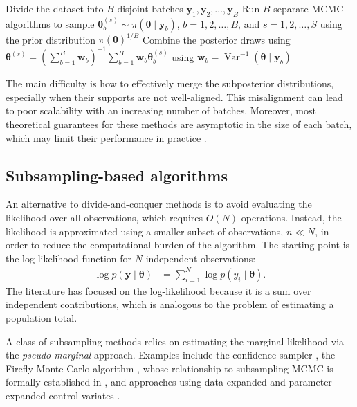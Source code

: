 \begin{algorithm}[h!]
	\caption{Consensus Monte Carlo algorithm}\label{Alg:CMC}
	\begin{algorithmic}[1]
		\State Divide the dataset into \( B \) disjoint batches $\mathbf{y}_1, \mathbf{y}_2, \dots, \mathbf{y}_B$
		\State Run $B$ separate MCMC algorithms to sample $\boldsymbol{\theta}_b^{(s)}\sim \pi(\boldsymbol{\theta}\mid \mathbf{y}_b)$, $b=1,2,\dots,B$, and $s=1,2,\dots,S$ using the prior distribution $\pi(\boldsymbol{\theta})^{1/B}$
		\State Combine the posterior draws using $\boldsymbol{\theta}^{(s)}=\left(\sum_{b=1}^B\mathbf{w}_b\right)^{-1} \sum_{b=1}^B\mathbf{w}_b \boldsymbol{\theta}^{(s)}_b$ using \( \mathbf{w}_b = \operatorname{Var}^{-1}(\boldsymbol{\theta} \mid \mathbf{y}_b) \)    		 			 
	\end{algorithmic} 
\end{algorithm}

The main difficulty is how to effectively merge the subposterior distributions, especially when their supports are not well-aligned. This misalignment can lead to poor scalability with an increasing number of batches. Moreover, most theoretical guarantees for these methods are asymptotic in the size of each batch, which may limit their performance in practice \cite{bardenet2017markov}.

\subsection{Subsampling-based algorithms}

An alternative to divide-and-conquer methods is to avoid evaluating the likelihood over all observations, which requires \( O(N) \) operations. Instead, the likelihood is approximated using a smaller subset of observations, \( n \ll N \), in order to reduce the computational burden of the algorithm. The starting point is the log-likelihood function for \( N \) independent observations:
\begin{align*}
	\log p(\mathbf{y} \mid \boldsymbol{\theta}) &= \sum_{i=1}^N \log p(y_i \mid \boldsymbol{\theta}).
\end{align*}
The literature has focused on the log-likelihood because it is a sum over independent contributions, which is analogous to the problem of estimating a population total.

A class of subsampling methods relies on estimating the marginal likelihood via the \textit{pseudo-marginal} approach. Examples include the confidence sampler \cite{bardenet2014towards}, the Firefly Monte Carlo algorithm \cite{Maclaurin2015}, whose relationship to subsampling MCMC is formally established in \cite{bardenet2017markov}, and approaches using data-expanded and parameter-expanded control variates \cite{quiroz2019speeding}.

